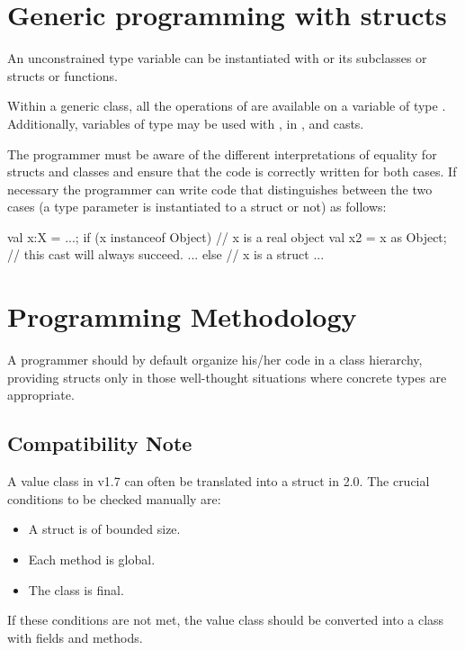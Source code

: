 \section{Generic programming with structs}

An unconstrained type variable  can be instantiated with  or
its subclasses or structs or functions.

Within a generic class, all the operations of  are available
on a variable of type . Additionally, variables of type  may
be used with \Xcd{==, !=}, in , and casts.

The programmer must be aware of the different interpretations of
equality for structs and classes and ensure that the code is correctly
written for both cases. If necessary the programmer can write code
that distinguishes between the two cases (a type parameter  is
instantiated to a struct or not) as follows:

\begin{xten}
val x:X = ...;
if (x instanceof Object) { // x is a real object
   val x2 = x as Object; // this cast will always succeed.
   ...
} else { // x is a struct
   ...
}
\end{xten}
 
  
\section{Programming Methodology}

 A programmer should by default organize his/her code in a class
 hierarchy, providing structs only in those well-thought situations
 where concrete types are appropriate.

\subsection{Compatibility Note}

A value class in \Xten{} v1.7 can often be translated into a struct in \Xten{} 2.0. The crucial conditions to be checked manually are: \begin{itemize}
\item  A struct is of bounded size. 
\item  Each method is global. 
\item  The class is final.
\end{itemize}
 

If these conditions are not met, the value class should be converted
into a class with  fields and methods.


